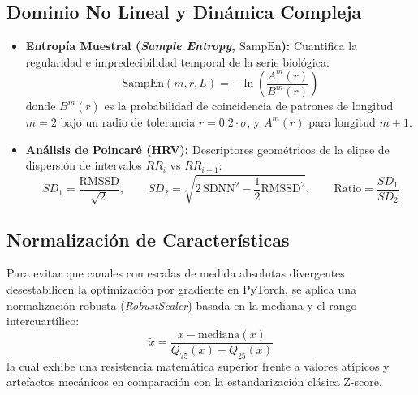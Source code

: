 \subsection{Dominio No Lineal y Dinámica Compleja}
\begin{itemize}
    \item \textbf{Entropía Muestral (\textit{Sample Entropy}, $\text{SampEn}$):} Cuantifica la regularidad e impredecibilidad temporal de la serie biológica:
    \begin{equation}
        \text{SampEn}(m, r, L) = -\ln \left( \frac{A^m(r)}{B^m(r)} \right)
    \end{equation}
    donde $B^m(r)$ es la probabilidad de coincidencia de patrones de longitud $m=2$ bajo un radio de tolerancia $r = 0.2 \cdot \sigma$, y $A^m(r)$ para longitud $m+1$.
    \item \textbf{Análisis de Poincaré (HRV):} Descriptores geométricos de la elipse de dispersión de intervalos $RR_i$ vs $RR_{i+1}$:
    \begin{equation}
        SD_1 = \frac{\text{RMSSD}}{\sqrt{2}}, \qquad SD_2 = \sqrt{2\,\text{SDNN}^2 - \frac{1}{2}\text{RMSSD}^2}, \qquad \text{Ratio} = \frac{SD_1}{SD_2}
    \end{equation}
\end{itemize}

\subsection{Normalización de Características}
Para evitar que canales con escalas de medida absolutas divergentes desestabilicen la optimización por gradiente en PyTorch, se aplica una normalización robusta (\textit{RobustScaler}) basada en la mediana y el rango intercuartílico:
\begin{equation}
    \tilde{x} = \frac{x - \text{mediana}(x)}{Q_{75}(x) - Q_{25}(x)}
\end{equation}
la cual exhibe una resistencia matemática superior frente a valores atípicos y artefactos mecánicos en comparación con la estandarización clásica Z-score.
